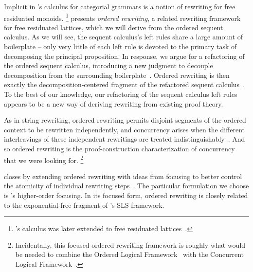 Implicit in \citeauthor{Lambek:AMM58}'s calculus for categorial grammars is a notion of rewriting for free residuated monoids.%
\footnote{'s calculus was later extended to free residuated lattices~\parencites{Lambek:SLIM61}{Abrusci:MLQ90}{Kanazawa:LLI92}.}
 presents \emph{ordered rewriting}, a related rewriting framework for free residuated lattices, which we will derive from the ordered sequent calculus.
As we will see, the sequent calculus's left rules share a large amount of boilerplate -- only very little of each left rule is devoted to the primary task of decomposing the principal proposition.
In response, we argue for a refactoring of the ordered sequent calculus, introducing a new judgment to decouple decomposition from the surrounding boilerplate~.
Ordered rewriting is then exactly
the decomposition-centered fragment of the refactored sequent calculus~.
To the best of our knowledge, our refactoring of the sequent calculus left rules appears to be a new way of deriving rewriting from existing proof theory.

As in string rewriting, ordered rewriting permits disjoint segments of the ordered context to be rewritten independently, and concurrency arises when the different interleavings of these independent rewritings are treated indistinguishably~.
And so ordered rewriting is the proof-construction characterization of concurrency that we were looking for.%
\footnote{Incidentally, this focused ordered rewriting framework is roughly what would be needed to combine the Ordered Logical Framework~\parencite{Polakow:CMU01} with the Concurrent Logical Framework~\parencite{Watkins+:CMU02}.}

 closes by extending ordered rewriting with ideas from focusing\autocites{Andreoli:JLC92} to better control the atomicity of individual rewriting steps~.
The particular formulation we choose is \citeauthor{Zeilberger:POPL08}'s higher-order focusing\autocite{Zeilberger:POPL08}.
In its focused form, ordered rewriting is closely related to the exponential-free fragment of \citeauthor{Simmons:CMU12}'s SLS framework.\autocite{Simmons:CMU12}


